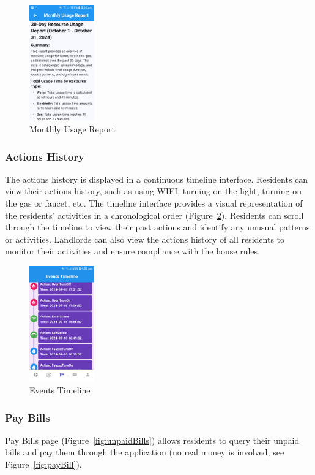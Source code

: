 \documentclass[sigconf,nonacm]{acmart}\settopmatter{printfolios=true}
\begin{document}
\begin{figure}[htbp]
  \centering
  \includegraphics[width=0.25\textwidth]{usageReport.jpg}
  \caption{Monthly Usage Report}
  \label{fig:usageReport}
\end{figure}

\subsubsection{\textbf{Actions History}}
The actions history is displayed in a continuous timeline interface. Residents can view their actions history, such as using WIFI, turning on the light, turning on the gas or faucet, etc. The timeline interface provides a visual representation of the residents' activities in a chronological order (Figure~\ref{fig:actionTimeline}). Residents can scroll through the timeline to view their past actions and identify any unusual patterns or activities. Landlords can also view the actions history of all residents to monitor their activities and ensure compliance with the house rules.

\begin{figure}[htbp]
  \centering
  \includegraphics[width=0.25\textwidth]{actionTimeline.jpg}
  \caption{Events Timeline}
  \label{fig:actionTimeline}
\end{figure}

\subsubsection{\textbf{Pay Bills}}
Pay Bills page (Figure~\ref{fig:unpaidBills}) allows residents to query their unpaid bills and pay them through the application (no real money is involved, see Figure~\ref{fig:payBill}).
\end{document}
